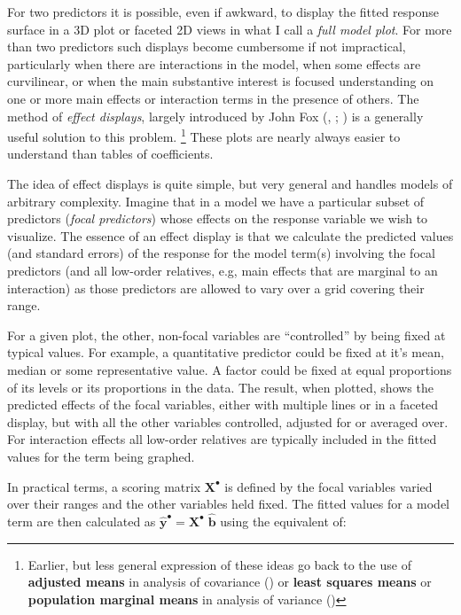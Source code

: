 \documentclass[
  letterpaper,
  10pt,
  krantz2]{krantz}
\begin{document}
{For two predictors it is possible, even if awkward, to display the
fitted response surface in a 3D plot or faceted 2D views in what I call
a \emph{full model plot}. For more than two predictors such displays
become cumbersome if not impractical, particularly when there are
interactions in the model, when some effects are curvilinear, or when
the main substantive interest is focused understanding on one or more
main effects or interaction terms in the presence of others. The method
of \emph{effect displays}, largely introduced by John Fox
(, ;
) is a generally
useful solution to this problem. \footnote{Earlier, but less general
  expression of these ideas go back to the use of \textbf{adjusted
  means} in analysis of covariance () or \textbf{least squares means} or \textbf{population marginal
  means} in analysis of variance ()} These plots are nearly always easier to understand
than tables of coefficients.

The idea of effect displays is quite simple, but very general and
handles models of arbitrary complexity. Imagine that in a model we have
a particular subset of predictors (\emph{focal predictors}) whose
effects on the response variable we wish to visualize. The essence of an
effect display is that we calculate the predicted values (and standard
errors) of the response for the model term(s) involving the focal
predictors (and all low-order relatives, e.g, main effects that are
marginal to an interaction) as those predictors are allowed to vary over
a grid covering their range.

For a given plot, the other, non-focal variables are ``controlled'' by
being fixed at typical values. For example, a quantitative predictor
could be fixed at it's mean, median or some representative value. A
factor could be fixed at equal proportions of its levels or its
proportions in the data. The result, when plotted, shows the predicted
effects of the focal variables, either with multiple lines or in a
faceted display, but with all the other variables controlled, adjusted
for or averaged over. For interaction effects all low-order relatives
are typically included in the fitted values for the term being graphed.

In practical terms, a scoring matrix \(\mathbf{X}^\bullet\) is defined
by the focal variables varied over their ranges and the other variables
held fixed. The fitted values for a model term are then calculated as
\(\widehat{\mathbf{y}}^\bullet = \mathbf{X}^\bullet \; \widehat{\mathbf{b}}\)
using the equivalent of:

}
\end{document}
